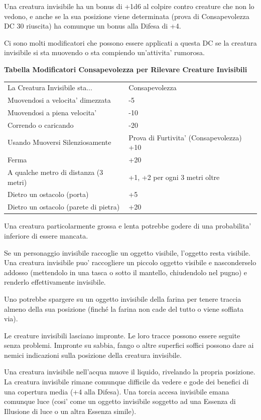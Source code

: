 \documentclass[a4paper,11pt,twoside,openany]{dndbook}
\begin{document}
Una creatura invisibile ha un bonus di +1d6 al colpire contro creature che non lo vedono, e anche se la sua posizione viene determinata (prova di Consapevolezza DC 30 riuscita) ha comunque un bonus alla Difesa di +4.

Ci sono molti modificatori che possono essere applicati a questa DC se la creatura invisibile si sta muovendo o sta compiendo un'attivita' rumorosa.

\bigskip

\textbf{Tabella Modificatori Consapevolezza per Rilevare Creature Invisibili}

\bigskip

\begin{tabular}[c]{@{}ll@{}}
\toprule 
La Creatura Invisibile sta... & Consapevolezza\tabularnewline
Muovendosi a velocita' dimezzata & -5\tabularnewline
Muovendosi a piena velocita' & -10\tabularnewline
Correndo o caricando & -20\tabularnewline
Usando Muoversi Silenziosamente & Prova di Furtivita' (Consapevolezza) +10\tabularnewline
Ferma & +20\tabularnewline
A qualche metro di distanza (3 metri) & +1, +2 per ogni 3 metri oltre\tabularnewline
Dietro un ostacolo (porta) & +5\tabularnewline
Dietro un ostacolo (parete di pietra) & +20\tabularnewline
\bottomrule
\end{tabular}

\bigskip

Una creatura particolarmente grossa e lenta potrebbe godere di una probabilita' inferiore di essere mancata.

Se un personaggio invisibile raccoglie un oggetto visibile, l'oggetto resta visibile. Una creatura invisibile puo' raccogliere un piccolo oggetto visibile e nasconderselo addosso (mettendolo in una tasca o sotto il mantello, chiudendolo nel pugno) e renderlo effettivamente invisibile.

Uno potrebbe spargere su un oggetto invisibile della farina per tenere traccia almeno della sua posizione (finché la farina non cade del tutto o viene soffiata via).

Le creature invisibili lasciano impronte. Le loro tracce possono essere seguite senza problemi. Impronte su sabbia, fango o altre superfici soffici possono dare ai nemici indicazioni sulla posizione della creatura invisibile.

Una creatura invisibile nell'acqua muove il liquido, rivelando la propria posizione. La creatura invisibile rimane comunque difficile da vedere e gode dei benefici di una copertura media (+4 alla Difesa). Una torcia accesa invisibile emana comunque luce (cosi' come un oggetto invisibile soggetto ad una Essenza di Illusione di luce o un altra Essenza simile).
\end{document}
